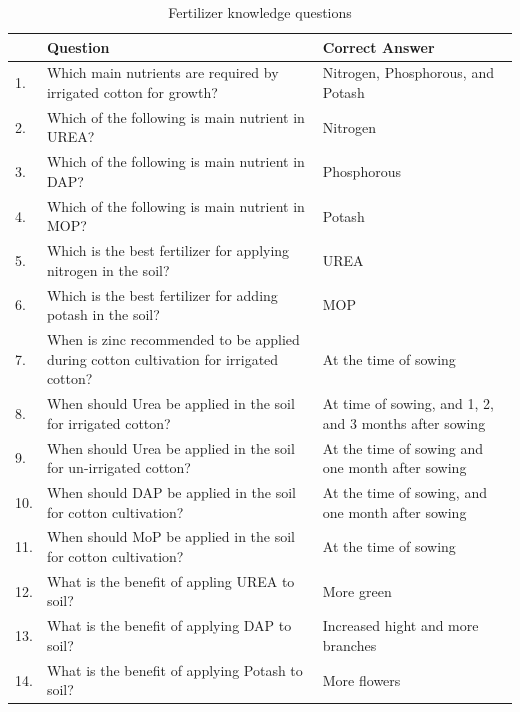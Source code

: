 \documentclass{article}
\begin{document}
\begin{table}[!htb] \centering \caption{Fertilizer knowledge questions} \label{t:knowledge-questions}
\begin{tabularx}{\linewidth}{lXX}
\hline \hline 
 & Question & Correct Answer \\
\hline
1. & Which main nutrients are required by irrigated cotton for growth? & Nitrogen, Phosphorous, and Potash \\ [1em]
2. & Which of the following is main nutrient in UREA? & Nitrogen \\ [1em]
3. & Which of the following is main nutrient in DAP? & Phosphorous \\ [1em]
4. & Which of the following is main nutrient in MOP? & Potash \\ [1em]
5. & Which is the best fertilizer for applying nitrogen in the soil? & UREA \\ [1em]
6. & Which is the best fertilizer for adding potash in the soil? & MOP \\ [1em]
7. & When is zinc recommended to be applied during cotton cultivation for irrigated cotton? & At the time of sowing \\ [1em]
8. & When should Urea be applied in the soil for irrigated cotton? & At time of sowing, and 1, 2, and 3 months after sowing \\ [1em]
9. & When should Urea be applied in the soil for un-irrigated cotton? & At the time of sowing and one month after sowing \\ [1em]
10. & When should DAP be applied in the soil for cotton cultivation? & At the time of sowing, and one month after sowing \\ [1em]
11. & When should MoP be applied in the soil for cotton cultivation? & At the time of sowing \\ [1em]
12. & What is the benefit of appling UREA to soil? & More green \\ [1em]
13. & What is the benefit of applying DAP to soil? & Increased hight and more branches \\ [1em]
14. & What is the benefit of applying Potash to soil? & More flowers \\ 
\hline
\end{tabularx}
\end{table}

\FloatBarrier

\pagebreak
\clearpage

\FloatBarrier
\end{document}

